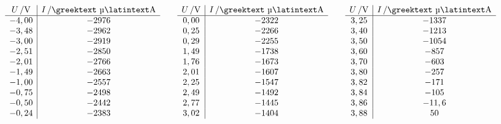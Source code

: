 \documentclass[numbers=noenddot,12pt,a4paper]{scrartcl}
\newcommand{\greek}[1]{\greektext#1\latintext}
\begin{document}
\begin{table}[H]
	\begin{align*}
	\begin{array}{c|c}
	\unit[U]{/V} & \unit[I]{/\text{\greek{µ}}A}\\\hline
	-4,00 & -2976 \\
	-3,48 & -2962 \\
	-3,00 & -2919 \\
	-2,51 & -2850 \\
	-2,01 & -2766 \\
	-1,49 & -2663 \\
	-1,00 & -2557 \\
	-0,75 & -2498 \\
	-0,50 & -2442 \\
	-0,24 & -2383 \\
	\end{array}
	\hspace{2em}
	\begin{array}{c|c}
	\unit[U]{/V} & \unit[I]{/\text{\greek{µ}}A}\\\hline
	0,00 & -2322 \\
	0,25 & -2266 \\
	0,29 & -2255 \\
	1,49 & -1738 \\
	1,76 & -1673 \\
	2,01 & -1607 \\
	2,25 & -1547 \\
	2,49 & -1492 \\
	2,77 & -1445 \\
	3,02 & -1404 \\
	\end{array}
	\hspace{2em}
	\begin{array}{c|c}
	\unit[U]{/V} & \unit[I]{/\text{\greek{µ}}A}\\\hline
	3,25 & -1337 \\
	3,40 & -1213 \\
	3,50 & -1054 \\
	3,60 & -857 \\
	3,70 & -603 \\
	3,80 & -257 \\
	3,82 & -171 \\
	3,84 & -105 \\
	3,86 & -11,6 \\
	3,88 & 50 \\
	\end{array}
	\hspace{2em}

\end{align*}
\end{table}
\end{document}
